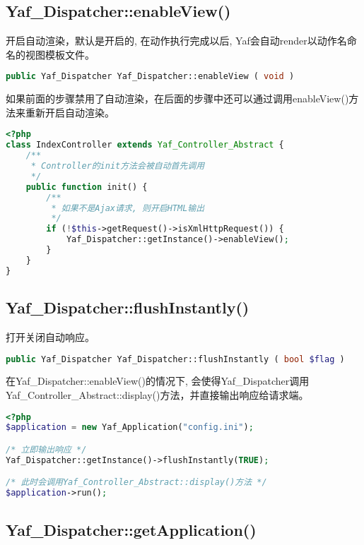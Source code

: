 \subsection{Yaf\_Dispatcher::enableView()}

开启自动渲染，默认是开启的, 在动作执行完成以后, Yaf会自动render以动作名命名的视图模板文件。


\begin{lstlisting}[language=PHP]
public Yaf_Dispatcher Yaf_Dispatcher::enableView ( void )
\end{lstlisting}

如果前面的步骤禁用了自动渲染，在后面的步骤中还可以通过调用enableView()方法来重新开启自动渲染。

\begin{lstlisting}[language=PHP]
<?php
class IndexController extends Yaf_Controller_Abstract {
    /**
     * Controller的init方法会被自动首先调用
     */
    public function init() {
        /**
         * 如果不是Ajax请求, 则开启HTML输出
         */
        if (!$this->getRequest()->isXmlHttpRequest()) {
            Yaf_Dispatcher::getInstance()->enableView();
        }
    }
}
\end{lstlisting}


\subsection{Yaf\_Dispatcher::flushInstantly()}

打开关闭自动响应。

\begin{lstlisting}[language=PHP]
public Yaf_Dispatcher Yaf_Dispatcher::flushInstantly ( bool $flag )
\end{lstlisting}

在Yaf\_Dispatcher::enableView()的情况下, 会使得Yaf\_Dispatcher调用Yaf\_Controller\_Abstract::display()方法，并直接输出响应给请求端。


\begin{lstlisting}[language=PHP]
<?php
$application = new Yaf_Application("config.ini");

/* 立即输出响应 */
Yaf_Dispatcher::getInstance()->flushInstantly(TRUE);

/* 此时会调用Yaf_Controller_Abstract::display()方法 */
$application->run();
\end{lstlisting}



\subsection{Yaf\_Dispatcher::getApplication()}

